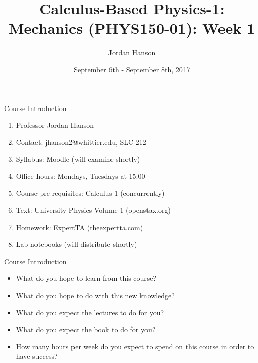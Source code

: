\documentclass{beamer}
\title{Calculus-Based Physics-1: Mechanics (PHYS150-01): Week 1}
\date{September 6th - September 8th, 2017}
\author{Jordan Hanson}
\institute{Whittier College Department of Physics and Astronomy}
\begin{document}
\maketitle

\begin{frame}{Course Introduction}
\begin{enumerate}
\item Professor Jordan Hanson
\item Contact: jhanson2@whittier.edu, SLC 212
\item Syllabus: Moodle (will examine shortly)
\item Office hours: Mondays, Tuesdays at 15:00
\item Course pre-requisites: Calculus 1 (concurrently)
\item Text: University Physics Volume 1 (openstax.org)
\item Homework: ExpertTA (theexpertta.com)
\item Lab notebooks (will distribute shortly)
\end{enumerate}
\end{frame}

\begin{frame}{Course Introduction}
\begin{itemize}
\item What do you hope to learn from this course?
\item What do you hope to do with this new knowledge?
\item What do you expect the lectures to do for you?
\item What do you expect the book to do for you?
\item How many hours per week do you expect to spend on this course in order to have success?
\end{itemize}
\end{frame}
\end{document}
